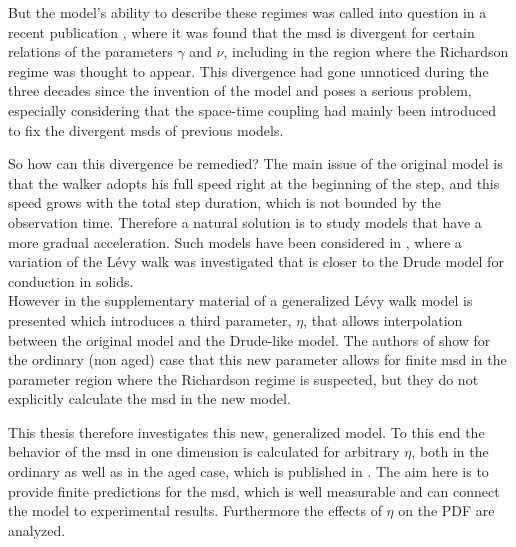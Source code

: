 But the model's ability to describe these regimes was called into question in a recent publication 
\cite{radons2018}
, where it was found that the \gls*{msd} is divergent for certain relations of the parameters $\gamma$ and $\nu$, including in the region where the Richardson regime was thought to appear. This divergence had gone unnoticed during the three decades since the invention of the model and poses a serious problem, especially considering that the space-time coupling had mainly been introduced to fix the divergent \gls*{msd}s of previous models. 

So how can this divergence be remedied? The main issue of the original model is that the walker adopts his full speed right at the beginning of the step, and this speed grows with the total step duration, which is not bounded by the observation time. Therefore a natural solution is to study models that have a more gradual acceleration. Such models have been considered in 
\cite{BarkaiKlafterBuch,schulz1997}
, where a variation of the L\'evy walk was investigated that is closer to the Drude model for conduction in solids.\\
However in the supplementary material of 
\cite{radons2018}
 a generalized L\'evy walk model is presented which introduces a third parameter, $\eta$, that allows interpolation between the original model and the Drude-like model. The authors of 
 \cite{radons2018}
  show for the ordinary (non aged) case that this new parameter allows for finite \gls*{msd} in the parameter region where the Richardson regime is suspected, but they do not explicitly calculate the \gls*{msd} in the new model.
 
This thesis therefore investigates this new, generalized model. To this end the behavior of the \gls*{msd} in one dimension is calculated for arbitrary $\eta$, both in the ordinary as well as in the aged case, which is published in 
\cite{bothe}
. The aim here is to provide finite predictions for the \gls*{msd}, which is well measurable and can connect the model to experimental results. Furthermore the effects of $\eta$ on the \gls*{PDF} are analyzed.


